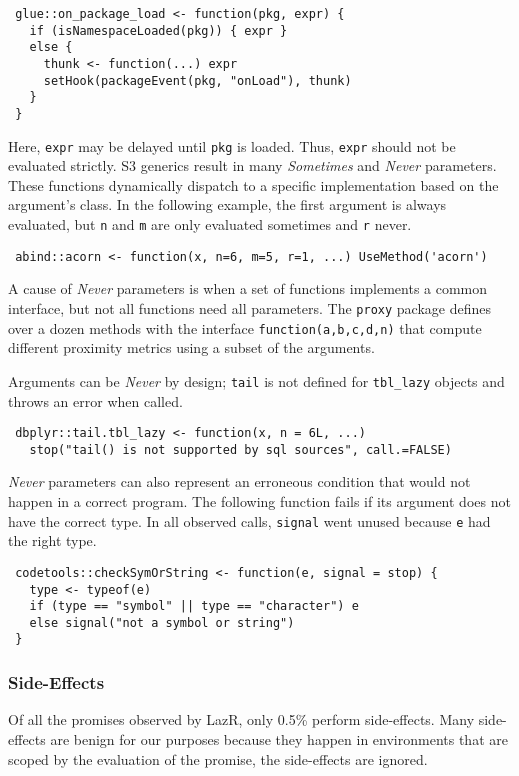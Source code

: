 \documentclass[review,nonacm,screen,acmsmall,anonymous=true]{acmart}
\newcommand{\sometimes}{\emph{Sometimes}\xspace}
\newcommand{\never}{\emph{Never}\xspace}
\newcommand{\code}[1]{\lstinline |#1|\xspace}
\newcommand{\lazr}{{\sf LazR}\xspace}
\begin{document}
\begin{lstlisting}
 glue::on_package_load <- function(pkg, expr) {
   if (isNamespaceLoaded(pkg)) { expr }
   else {
     thunk <- function(...) expr
     setHook(packageEvent(pkg, "onLoad"), thunk)
   }
 }
\end{lstlisting}
%
Here, \code{expr} may be delayed until \code{pkg} is loaded. Thus, \code{expr}
should not be evaluated strictly.
%
S3 generics result in many \sometimes and \never parameters. These functions
dynamically dispatch to a specific implementation based on the argument's class.
In the following example, the first argument is always evaluated, but \code{n}
and \code{m} are only evaluated sometimes and \code{r} never.
%
\begin{lstlisting}
 abind::acorn <- function(x, n=6, m=5, r=1, ...) UseMethod('acorn')
\end{lstlisting}
\noindent
A cause of \never parameters is when a set of functions implements a common
interface, but not all functions need all parameters. The \code{proxy} package
defines over a dozen methods with the interface \code{function(a,b,c,d,n)} that
compute different proximity metrics using a subset of the arguments.

Arguments can be \never by design; \code{tail} is not defined for
\code{tbl_lazy} objects and throws an error when called.
\begin{lstlisting}
 dbplyr::tail.tbl_lazy <- function(x, n = 6L, ...)
   stop("tail() is not supported by sql sources", call.=FALSE)
\end{lstlisting}
%
\never parameters can also represent an erroneous condition that would not
happen in a correct program. The following function fails if its argument does
not have the correct type. In all observed calls, \code{signal}
went  unused because \code{e} had the right type.
\begin{lstlisting}
 codetools::checkSymOrString <- function(e, signal = stop) {
   type <- typeof(e)
   if (type == "symbol" || type == "character") e
   else signal("not a symbol or string")
 }
\end{lstlisting}

\subsubsection{Side-Effects}

Of all the promises observed by \lazr, only 0.5\% perform side-effects. Many
side-effects are benign for our purposes because they happen in environments
that are scoped by the evaluation of the promise, the side-effects are ignored.
\end{document}
